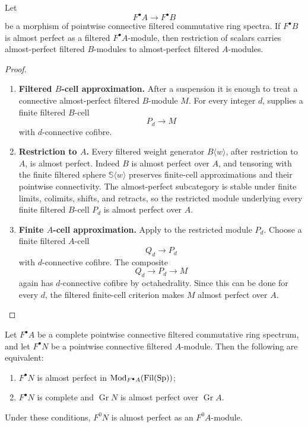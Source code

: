 \begin{lemma}
\label{lem:filtered-almost-perfect-restriction-transitivity}
Let
\[
    F^\bullet A\longrightarrow F^\bullet B
\]
be a morphism of pointwise connective filtered commutative ring spectra. If
\(F^\bullet B\) is almost perfect as a filtered \(F^\bullet A\)-module, then
restriction of scalars carries almost-perfect filtered \(B\)-modules to
almost-perfect filtered \(A\)-modules.
\end{lemma}

\begin{proof}
\leavevmode
\begin{enumerate}[label=\textup{(\arabic*)}]
    \item \textbf{Filtered \(B\)-cell approximation.}
    After a suspension it is enough to treat a connective almost-perfect filtered
    \(B\)-module \(M\). For every integer \(d\),
     supplies a finite filtered
    \(B\)-cell
    \[
        P_d\longrightarrow M
    \]
    with \(d\)-connective cofibre.
    \item \textbf{Restriction to \(A\).}
    Every filtered weight generator \(B\langle w\rangle\), after restriction to
    \(A\), is almost perfect. Indeed \(B\) is almost perfect over \(A\), and
    tensoring with the finite filtered sphere \(\mathbb S\langle w\rangle\)
    preserves finite-cell approximations and their pointwise connectivity. The
    almost-perfect subcategory is stable under finite limits, colimits, shifts,
    and retracts, so the restricted module underlying every finite filtered
    \(B\)-cell \(P_d\) is almost perfect over \(A\).
    \item \textbf{Finite \(A\)-cell approximation.}
    Apply  to the restricted module
    \(P_d\). Choose a finite filtered \(A\)-cell
    \[
        Q_d\longrightarrow P_d
    \]
    with \(d\)-connective cofibre. The composite
    \[
        Q_d\longrightarrow P_d\longrightarrow M
    \]
    again has \(d\)-connective cofibre by octahedrality. Since this can be done
    for every \(d\), the filtered finite-cell criterion makes \(M\) almost
    perfect over \(A\).
\end{enumerate}
\end{proof}


\begin{theorem}
\label{thm:filtered-almost-perfect-detection}
Let \(F^\bullet A\) be a complete pointwise connective filtered commutative
ring spectrum, and let \(F^\bullet N\) be a pointwise connective filtered
\(A\)-module. Then the following are equivalent:
\begin{enumerate}[label=(\roman*)]
    \item \(F^\bullet N\) is almost perfect in
    \(\operatorname{Mod}_{F^\bullet A}(\operatorname{Fil}(\operatorname{Sp}))\);
    \item \(F^\bullet N\) is complete and
    \(\operatorname{Gr}N\) is almost perfect over
    \(\operatorname{Gr}A\).
\end{enumerate}
Under these conditions, \(F^0N\) is almost perfect as an
\(F^0A\)-module.
\end{theorem}

